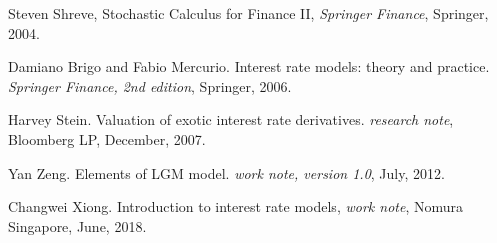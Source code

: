\documentclass[10pt]{article}
\theoremstyle{plain}
\numberwithin{equation}{section}
\numberwithin{table}{section}
\begin{document}
\newpage

\begin{thebibliography}{99}
 Steven Shreve, Stochastic Calculus for Finance II, {\it Springer Finance},  Springer, 2004. 

 Damiano Brigo and Fabio Mercurio. Interest rate models: theory and practice. {\it Springer Finance, 2nd edition}, Springer, 2006.

 Harvey Stein. Valuation of exotic interest rate derivatives. {\it research note}, Bloomberg LP, December, 2007.

 Yan Zeng. Elements of LGM model. {\it
work note, version 1.0}, July, 2012.

 Changwei Xiong. Introduction to interest rate models, {\it work note}, Nomura Singapore, June, 2018.

\end{thebibliography}
\end{document}
